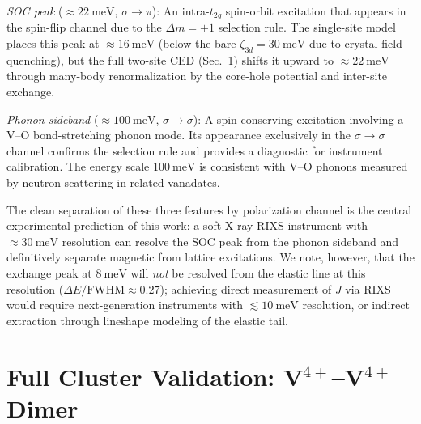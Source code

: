 \documentclass[aps,prb,twocolumn,superscriptaddress,longbibliography]{revtex4-2}
\begin{document}
\textit{SOC peak} ($\approx \SI{22}{\milli\eV}$, $\sigma \to \pi$):
An intra-$t_{2g}$ spin-orbit excitation that appears in the spin-flip
channel due to the $\Delta m = \pm 1$ selection rule.
The single-site model places this peak at $\approx \SI{16}{\milli\eV}$
(below the bare $\zeta_{3d} = \SI{30}{\milli\eV}$ due to crystal-field
quenching), but the full two-site CED (Sec.~\ref{sec:dimer}) shifts it
upward to $\approx \SI{22}{\milli\eV}$ through many-body renormalization
by the core-hole potential and inter-site exchange.

\textit{Phonon sideband} ($\approx \SI{100}{\milli\eV}$, $\sigma \to \sigma$):
A spin-conserving excitation involving a V--O bond-stretching phonon mode.
Its appearance exclusively in the $\sigma \to \sigma$ channel confirms the
selection rule and provides a diagnostic for instrument calibration.
The energy scale $\SI{100}{\milli\eV}$ is consistent with V--O phonons
measured by neutron scattering in related vanadates.

The clean separation of these three features by polarization channel is the
central experimental prediction of this work: a soft X-ray RIXS instrument
with $\approx \SI{30}{\milli\eV}$ resolution can resolve the SOC peak
from the phonon sideband and definitively separate magnetic from lattice
excitations.
We note, however, that the exchange peak at $\SI{8}{\milli\eV}$ will \emph{not}
be resolved from the elastic line at this resolution ($\Delta E/\text{FWHM}
\approx 0.27$); achieving direct measurement of $J$ via RIXS would require
next-generation instruments with $\lesssim \SI{10}{\milli\eV}$ resolution,
or indirect extraction through lineshape modeling of the elastic tail.

\section{Full Cluster Validation: V$^{4+}$--V$^{4+}$ Dimer}
\label{sec:dimer}
\end{document}
